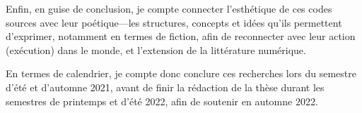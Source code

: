 \documentclass{article}
\begin{document}
Enfin, en guise de conclusion, je compte connecter l'esthétique de ces codes sources avec leur poétique—les structures, concepts et idées qu'ils permettent d'exprimer, notamment en termes de fiction, afin de reconnecter avec leur action (exécution) dans le monde, et l'extension de la littérature numérique.

En termes de calendrier, je compte donc conclure ces recherches lors du semestre d'été et d'automne 2021, avant de finir la rédaction de la thèse durant les semestres de printemps et d'été 2022, afin de soutenir en automne 2022.

\pagebreak



\end{document}
